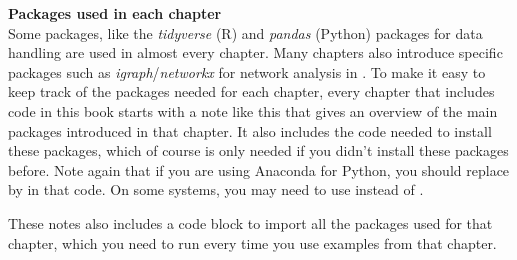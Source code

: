 \begin{feature}
\textbf{Packages used in each chapter}\\
Some packages, like the \emph{tidyverse} (R) and \emph{pandas} (Python) packages for data handling are used in almost every chapter.
Many chapters also introduce specific packages such as \emph{igraph}/\emph{networkx} for network analysis in .
To make it easy to keep track of the packages needed for each chapter,
every chapter that includes code in this book starts with a note like this that gives an overview of the main packages introduced in that chapter.
It also includes the code needed to install these packages, which of course is only needed if you didn't install these packages before.
Note again that if you are using Anaconda for Python,
you should replace  by  in that code. On some systems, you may need to use  instead of .

These notes also includes a code block to import all the packages used for that chapter,
which you need to run every time you use examples from that chapter.
\end{feature}

%
